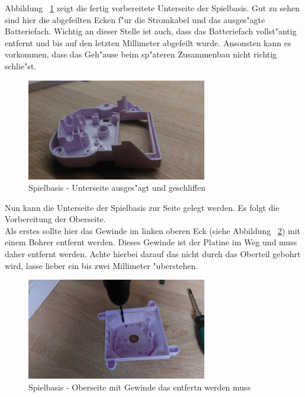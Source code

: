 Abbildung ~\ref{fig9} zeigt die fertig vorbereitete Unterseite der Spielbasis. Gut zu sehen sind hier die abgefeilten Ecken f"ur die Stromkabel und das ausges"agte Batteriefach.
Wichtig an dieser Stelle ist auch, dass das Batteriefach vollst"antig entfernt und bis auf den letzten Millimeter abgefeilt wurde. Ansonsten kann es vorkommen, dass das Geh"ause beim sp"ateren Zusammenbau nicht richtig schlie"st.

\vspace{1cm}
\begin{figure}[!ht]
	\centering
  	\includegraphics[width=0.7\textwidth]{pictures/loolou_009.jpg}
	\caption{Spielbasis - Unterseite ausges"agt und geschliffen}
	\label{fig9}
\end{figure}
\vspace{0.5cm}

Nun kann die Unterseite der Spielbasis zur Seite gelegt werden. Es folgt die Vorbereitung der Oberseite. \\
Als erstes sollte hier das Gewinde im linken oberen Eck (siehe Abbildung ~\ref{fig10}) mit einem Bohrer entfernt werden. Dieses Gewinde ist der Platine im Weg und muss daher entfernt werden.
Achte hierbei darauf das nicht durch das Oberteil gebohrt wird, lasse lieber ein bis zwei Millimeter "uberstehen.
 
\vspace{1cm}
\begin{figure}[!ht]
	\centering
  	\includegraphics[width=0.7\textwidth]{pictures/loolou_010.jpg}
	\caption{Spielbasis - Oberseite mit Gewinde das entfertn werden muss}
	\label{fig10}
\end{figure}
\vspace{0.5cm}

